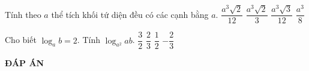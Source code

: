 \begin{ex}%
 Tính theo $a$  thể tích khối tứ diện đều có các cạnh bằng 
$a$. 
\choice
{\True $\dfrac{a^3\sqrt{2}}{12}$}
{$\dfrac{a^3\sqrt{2}}{3}$}
{$\dfrac{a^3\sqrt{3}}{12}$}
{$\dfrac{a^3}{8}$}
\end{ex}

\begin{ex}%
Cho biết $\log_a b = 2$. Tính $\log_{a^2}ab$.
\choice
{\True $\dfrac{3}{2}$}
{$\dfrac{2}{3}$}
{$\dfrac{1}{2}$}
{$-\dfrac{2}{3}$}
\end{ex}
\newpage
\begin{center}
	\textbf{ĐÁP ÁN}
\end{center}
\begin{multicols}{10}
	
\end{multicols}


